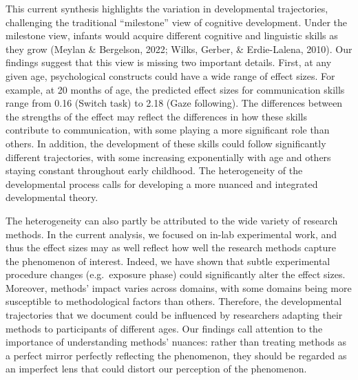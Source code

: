 \documentclass[10pt, letterpaper]{article}
\begin{document}
This current synthesis highlights the variation in developmental
trajectories, challenging the traditional ``milestone'' view of
cognitive development. Under the milestone view, infants would acquire
different cognitive and linguistic skills as they grow (Meylan \&
Bergelson, 2022; Wilks, Gerber, \& Erdie-Lalena, 2010). Our findings
suggest that this view is missing two important details. First, at any
given age, psychological constructs could have a wide range of effect
sizes. For example, at 20 months of age, the predicted effect sizes for
communication skills range from 0.16 (Switch task) to 2.18 (Gaze
following). The differences between the strengths of the effect may
reflect the differences in how these skills contribute to communication,
with some playing a more significant role than others. In addition, the
development of these skills could follow significantly different
trajectories, with some increasing exponentially with age and others
staying constant throughout early childhood. The heterogeneity of the
developmental process calls for developing a more nuanced and integrated
developmental theory.

The heterogeneity can also partly be attributed to the wide variety of
research methods. In the current analysis, we focused on in-lab
experimental work, and thus the effect sizes may as well reflect how
well the research methods capture the phenomenon of interest. Indeed, we
have shown that subtle experimental procedure changes (e.g.~exposure
phase) could significantly alter the effect sizes. Moreover, methods'
impact varies across domains, with some domains being more susceptible
to methodological factors than others. Therefore, the developmental
trajectories that we document could be influenced by researchers
adapting their methods to participants of different ages. Our findings
call attention to the importance of understanding methods' nuances:
rather than treating methods as a perfect mirror perfectly reflecting
the phenomenon, they should be regarded as an imperfect lens that could
distort our perception of the phenomenon.
\end{document}
